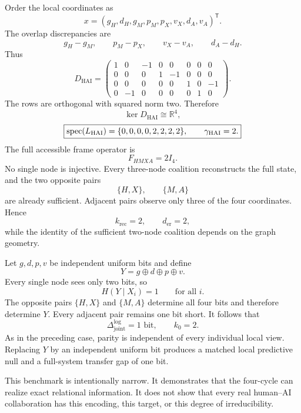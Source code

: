 
Order the local coordinates as
\[
x=(g_H,d_H,g_M,p_M,p_X,v_X,d_A,v_A)^{\mathsf T}.
\]
The overlap discrepancies are
\[
g_H-g_M,
\qquad
p_M-p_X,
\qquad
v_X-v_A,
\qquad
d_A-d_H.
\]
Thus
\[
D_{\mathrm{HAI}}
=
\begin{pmatrix}
1&0&-1&0&0&0&0&0\\
0&0&0&1&-1&0&0&0\\
0&0&0&0&0&1&0&-1\\
0&-1&0&0&0&0&1&0
\end{pmatrix}.
\]
The rows are orthogonal with squared norm two. Therefore
\[
\ker D_{\mathrm{HAI}}
\cong\mathbb R^4,
\]
\[
\boxed{
\operatorname{spec}(L_{\mathrm{HAI}})
=
\{0,0,0,0,2,2,2,2\},
\qquad
\gamma_{\mathrm{HAI}}=2.
}
\]
The full accessible frame operator is
\[
F_{HMXA}=2I_4.
\]
No single node is injective. Every three-node coalition reconstructs the full
state, and the two opposite pairs
\[
\{H,X\},
\qquad
\{M,A\}
\]
are already sufficient. Adjacent pairs observe only three of the four
coordinates. Hence
\[
k_{\mathrm{rec}}=2,
\qquad
d_{\mathrm{er}}=2,
\]
while the identity of the sufficient two-node coalition depends on the graph
geometry.


Let \(g,d,p,v\) be independent uniform bits and define
\[
Y=g\oplus d\oplus p\oplus v.
\]
Every single node sees only two bits, so
\[
H(Y\mid X_i)=1
\qquad\text{for all }i.
\]
The opposite pairs \(\{H,X\}\) and \(\{M,A\}\) determine all four bits and
therefore determine \(Y\). Every adjacent pair remains one bit short. It
follows that
\[
\boxed{
\Delta_{\mathrm{joint}}^{\log}=1\text{ bit},
\qquad
k_0=2.
}
\]
As in the preceding case, parity is independent of every individual local
view. Replacing \(Y\) by an independent uniform bit produces a matched local
predictive null and a full-system transfer gap of one bit.

This benchmark is intentionally narrow. It demonstrates that the four-cycle
can realize exact relational information. It does not show that every real
human--AI collaboration has this encoding, this target, or this degree of
irreducibility.


